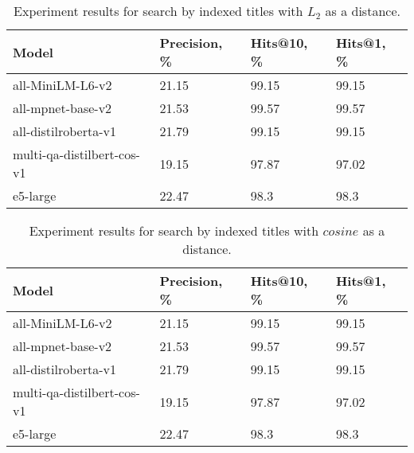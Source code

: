 \begin{table*}[!htbp]
    \small
    \centering
    \caption{Experiment results for search by indexed titles with \(L_{2}\) as a distance.}

    \begin{tabularx}{0.99\textwidth}{XIII}

        \toprule

        \bfseries Model & \bfseries Precision, \% & \bfseries Hits@10, \% & \bfseries Hits@1, \% \\

        \midrule
        
        all-MiniLM-L6-v2	& 21.15 &	99.15 &	99.15 \\
        all-mpnet-base-v2	& 21.53 &	99.57 &	99.57 \\
        all-distilroberta-v1	& 21.79 &	99.15 &	99.15 \\
        multi-qa-distilbert-cos-v1	& 19.15 &	97.87 &	97.02 \\
        e5-large	& 22.47 &	98.3  &	98.3 \\

        \bottomrule

    \end{tabularx}

    \label{tab:experiments:title-l2}
\end{table*}

\begin{table*}[!htbp]
    \small
    \centering
    \caption{Experiment results for search by indexed titles with \(cosine\) as a distance.}

    \begin{tabularx}{0.99\textwidth}{XIII}

        \toprule

        \bfseries Model & \bfseries Precision, \% & \bfseries Hits@10, \% & \bfseries Hits@1, \% \\

        \midrule
        
        all-MiniLM-L6-v2	& 21.15 &	99.15 &	99.15 \\
        all-mpnet-base-v2	& 21.53 &	99.57 &	99.57 \\
        all-distilroberta-v1	& 21.79 &	99.15 &	99.15 \\
        multi-qa-distilbert-cos-v1	& 19.15 &	97.87 &	97.02 \\
        e5-large	& 22.47 &	98.3  &	98.3 \\

        \bottomrule

    \end{tabularx}

    \label{tab:experiments:title-cos}
\end{table*}
